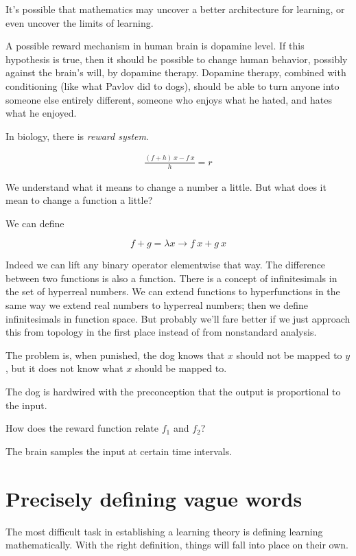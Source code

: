 It's possible that mathematics may uncover a better architecture for learning,
or even uncover the limits of learning.

A possible reward mechanism in human brain is dopamine level.
If this hypothesis is true, then it should be possible to change human behavior,
possibly against the brain's will, by dopamine therapy.
Dopamine therapy, combined with conditioning (like what Pavlov did to dogs),
should be able to turn anyone into someone else entirely different,
someone who enjoys what he hated, and hates what he enjoyed.

In biology, there is \emph{reward system}.

\begin{align*}
    \frac{(f + h)~x - f~x}{h} = r
\end{align*}

We understand what it means to change a number a little.
But what does it mean to change a function a little?

We can define

\[
    f + g = \lambda x \to f~x+g~x
\]

Indeed we can lift any binary operator elementwise that way.
The difference between two functions is also a function.
There is a concept of infinitesimals in the set of hyperreal numbers.
We can extend functions to hyperfunctions in the same way
we extend real numbers to hyperreal numbers;
then we define infinitesimals in function space.
But probably we'll fare better if we just approach this from topology
in the first place instead of from nonstandard analysis.

The problem is, when punished, the dog knows that
\(x\) should not be mapped to \(y\),
but it does not know what \(x\) should be mapped to.

The dog is hardwired with the preconception that the output is proportional to the input.

How does the reward function relate \(f_1\) and \(f_2\)?

The brain samples the input at certain time intervals.

\section{Precisely defining vague words}

The most difficult task in establishing a learning theory is defining learning mathematically.
With the right definition, things will fall into place on their own.

